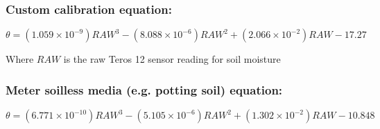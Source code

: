 \documentclass[12pt]{article}
\begin{document}
\subsubsection*{Custom calibration equation:}
\begin{equation*}
\theta = (1.059\times 10^{-9})RAW^3 - (8.088\times 10^{-6})RAW^2 + (2.066\times 10^{-2})RAW - 17.27
\end{equation*}

Where $RAW$ is the raw Teros 12 sensor reading for soil moisture

\subsubsection*{Meter soilless media (e.g. potting soil) equation:}
\begin{equation*}
\theta =   (6.771\times 10^{-10})RAW^3 - (5.105\times 10^{-6})RAW^2 + (1.302\times 10^{-2})RAW - 10.848
\end{equation*}
\end{document}
